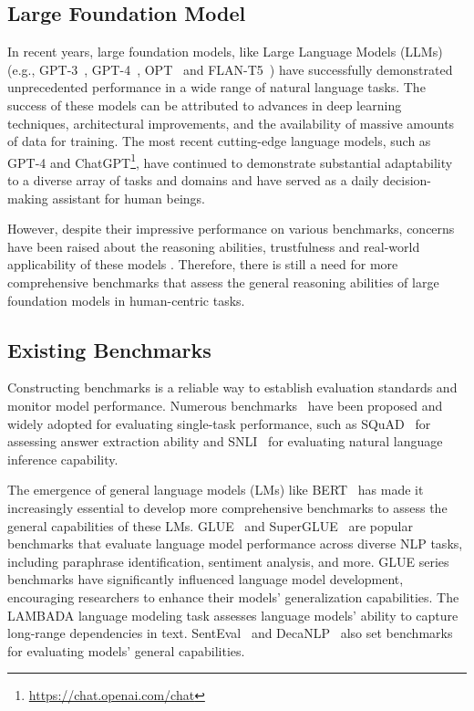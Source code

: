 \subsection{Large Foundation Model} In recent years, large foundation models, like Large Language Models (LLMs) (e.g., GPT-3~\citep{brown2020language}, GPT-4~\citep{openai2023gpt4}, OPT~\citep{zhang2022opt} and FLAN-T5~\citep{chung2022scaling}) have successfully demonstrated unprecedented performance in a wide range of natural language tasks. The success of these models can be attributed to advances in deep learning techniques, architectural improvements, and the availability of massive amounts of data for training. The most recent cutting-edge language models, such as GPT-4 \citep{openai2023gpt4} and ChatGPT\footnote{\url{https://chat.openai.com/chat}}, have continued to demonstrate substantial adaptability to a diverse array of tasks and domains and have served as a daily decision-making assistant for human beings.

 However, despite their impressive performance on various benchmarks, concerns have been raised about the reasoning abilities, trustfulness and real-world applicability of these models \citep{marcus2019rebooting}. Therefore, there is still a need for more comprehensive benchmarks that assess the general reasoning abilities of large foundation models in human-centric tasks. 
\subsection{Existing Benchmarks} Constructing benchmarks is a reliable way to establish evaluation standards and monitor model performance. Numerous benchmarks~\citep{thorne-etal-2018-fever,rajpurkar2016squad,bowman-etal-2015-large,ehrmann_introducing_2022} have been proposed and widely adopted for evaluating single-task performance, such as SQuAD~\citep{rajpurkar2016squad} for assessing answer extraction ability and SNLI~\citep{bowman-etal-2015-large} for evaluating natural language inference capability.

The emergence of general language models (LMs) like BERT~\citep{devlin-etal-2019-bert} has made it increasingly essential to develop more comprehensive benchmarks to assess the general capabilities of these LMs. GLUE~\citep{wang-etal-2018-glue} and SuperGLUE~\citep{wang2019superglue} are popular benchmarks that evaluate language model performance across diverse NLP tasks, including paraphrase identification, sentiment analysis, and more. GLUE series benchmarks have significantly influenced language model development, encouraging researchers to enhance their models' generalization capabilities. The LAMBADA language modeling task \citep{paperno2016lambada} assesses language models' ability to capture long-range dependencies in text. SentEval~\citep{conneau-kiela-2018-senteval} and DecaNLP~\citep{mccann2018natural} also set benchmarks for evaluating models' general capabilities.

